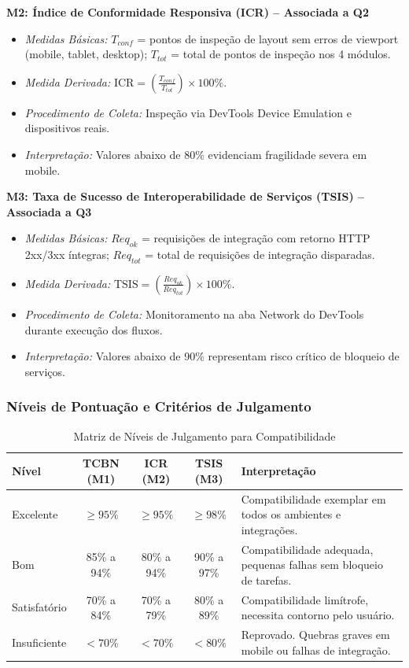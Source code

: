 \documentclass[12pt]{article}
\begin{document}
\textbf{M2: Índice de Conformidade Responsiva (ICR) -- Associada a Q2}
\begin{itemize}
    \item \textit{Medidas Básicas:} $T_{conf}$ = pontos de inspeção de layout sem erros de viewport (mobile, tablet, desktop); $T_{tot}$ = total de pontos de inspeção nos 4 módulos.
    \item \textit{Medida Derivada:} $\text{ICR} = \left( \frac{T_{conf}}{T_{tot}} \right) \times 100\%$.
    \item \textit{Procedimento de Coleta:} Inspeção via DevTools Device Emulation e dispositivos reais.
    \item \textit{Interpretação:} Valores abaixo de 80\% evidenciam fragilidade severa em mobile.
\end{itemize}

\textbf{M3: Taxa de Sucesso de Interoperabilidade de Serviços (TSIS) -- Associada a Q3}
\begin{itemize}
    \item \textit{Medidas Básicas:} $Req_{ok}$ = requisições de integração com retorno HTTP 2xx/3xx íntegras; $Req_{tot}$ = total de requisições de integração disparadas.
    \item \textit{Medida Derivada:} $\text{TSIS} = \left( \frac{Req_{ok}}{Req_{tot}} \right) \times 100\%$.
    \item \textit{Procedimento de Coleta:} Monitoramento na aba Network do DevTools durante execução dos fluxos.
    \item \textit{Interpretação:} Valores abaixo de 90\% representam risco crítico de bloqueio de serviços.
\end{itemize}

\subsubsection{Níveis de Pontuação e Critérios de Julgamento}
\begin{table}[h]
\centering
\caption{Matriz de Níveis de Julgamento para Compatibilidade}
\begin{tabular}{|l|c|c|c|p{4.5cm}|}
\hline
\textbf{Nível} & \textbf{TCBN (M1)} & \textbf{ICR (M2)} & \textbf{TSIS (M3)} & \textbf{Interpretação} \\ \hline
Excelente & $\ge 95\%$ & $\ge 95\%$ & $\ge 98\%$ & Compatibilidade exemplar em todos os ambientes e integrações. \\ \hline
Bom & 85\% a 94\% & 80\% a 94\% & 90\% a 97\% & Compatibilidade adequada, pequenas falhas sem bloqueio de tarefas. \\ \hline
Satisfatório & 70\% a 84\% & 70\% a 79\% & 80\% a 89\% & Compatibilidade limítrofe, necessita contorno pelo usuário. \\ \hline
Insuficiente & $< 70\%$ & $< 70\%$ & $< 80\%$ & Reprovado. Quebras graves em mobile ou falhas de integração. \\ \hline
\end{tabular}
\end{table}
\end{document}
